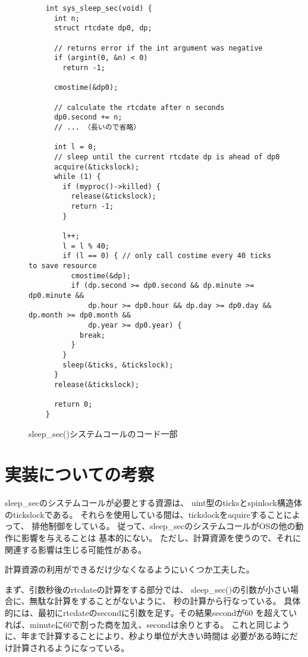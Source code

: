 \documentclass[a4j,11pt]{jarticle}
\begin{document}
\begin{figure}[H]
  \begin{lstlisting}
    int sys_sleep_sec(void) {
      int n;
      struct rtcdate dp0, dp;

      // returns error if the int argument was negative
      if (argint(0, &n) < 0)
        return -1;

      cmostime(&dp0);

      // calculate the rtcdate after n seconds
      dp0.second += n;
      // ... （長いので省略）

      int l = 0;
      // sleep until the current rtcdate dp is ahead of dp0
      acquire(&tickslock);
      while (1) {
        if (myproc()->killed) {
          release(&tickslock);
          return -1;
        }

        l++;
        l = l % 40;
        if (l == 0) { // only call costime every 40 ticks to save resource
          cmostime(&dp);
          if (dp.second >= dp0.second && dp.minute >= dp0.minute &&
              dp.hour >= dp0.hour && dp.day >= dp0.day && dp.month >= dp0.month &&
              dp.year >= dp0.year) {
            break;
          }
        }
        sleep(&ticks, &tickslock);
      }
      release(&tickslock);

      return 0;
    }
  \end{lstlisting}
  \caption{sleep\_sec()システムコールのコード一部}
  \label{sleepsec}
\end{figure}

\section{実装についての考察}

sleep\_secのシステムコールが必要とする資源は、
uint型のticksとspinlock構造体のtickslockである。
それらを使用している間は、tickslockをaquireすることによって、
排他制御をしている。
従って、sleep\_secのシステムコールがOSの他の動作に影響を与えることは
基本的にない。
ただし、計算資源を使うので、それに関連する影響は生じる可能性がある。


計算資源の利用ができるだけ少なくなるようにいくつか工夫した。


まず、引数秒後のrtcdateの計算をする部分では、
sleep\_sec()の引数が小さい場合に、無駄な計算をすることがないように、
秒の計算から行なっている。
具体的には、最初にrtcdateのsecondに引数を足す。その結果secondが60
を超えていれば、minuteに60で割った商を加え、secondは余りとする。
これと同じように、年まで計算することにより、秒より単位が大きい時間は
必要がある時にだけ計算されるようになっている。
\end{document}
